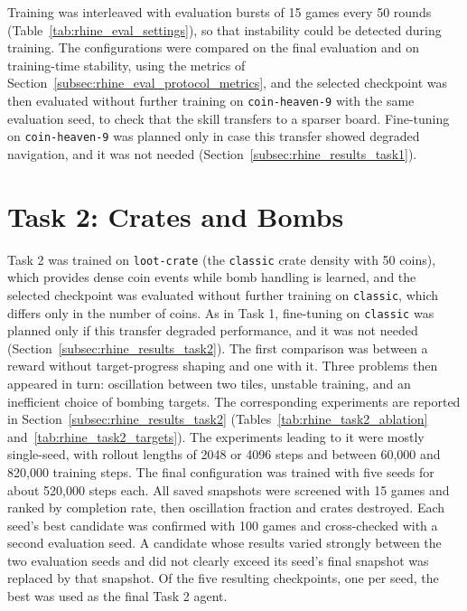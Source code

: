 \documentclass[11pt,a4paper]{report}
\begin{document}
	Training was interleaved with evaluation bursts of 15 games every 50 rounds (Table~\ref{tab:rhine_eval_settings}), so that instability could be detected during training. The configurations were compared on the final evaluation and on training-time stability, using the metrics of Section~\ref{subsec:rhine_eval_protocol_metrics}, and the selected checkpoint was then evaluated without further training on \texttt{coin-heaven-9} with the same evaluation seed, to check that the skill transfers to a sparser board. Fine-tuning on \texttt{coin-heaven-9} was planned only in case this transfer showed degraded navigation, and it was not needed (Section~\ref{subsec:rhine_results_task1}).
	
	\section{Task 2: Crates and Bombs}
	\label{subsec:rhine_training_task2}
	
	Task 2 was trained on \texttt{loot-crate} (the \texttt{classic} crate density with 50 coins), which provides dense coin events while bomb handling is learned, and the selected checkpoint was evaluated without further training on \texttt{classic}, which differs only in the number of coins. As in Task 1, fine-tuning on \texttt{classic} was planned only if this transfer degraded performance, and it was not needed (Section~\ref{subsec:rhine_results_task2}). The first comparison was between a reward without target-progress shaping and one with it. Three problems then appeared in turn: oscillation between two tiles, unstable training, and an inefficient choice of bombing targets. The corresponding experiments are reported in Section~\ref{subsec:rhine_results_task2} (Tables~\ref{tab:rhine_task2_ablation} and~\ref{tab:rhine_task2_targets}). The experiments leading to it were mostly single-seed, with rollout lengths of 2048 or 4096 steps and between 60{,}000 and 820{,}000 training steps. The final configuration was trained with five seeds for about 520{,}000 steps each. All saved snapshots were screened with 15 games and ranked by completion rate, then oscillation fraction and crates destroyed. Each seed's best candidate was confirmed with 100 games and cross-checked with a second evaluation seed. A candidate whose results varied strongly between the two evaluation seeds and did not clearly exceed its seed's final snapshot was replaced by that snapshot. Of the five resulting checkpoints, one per seed, the best was used as the final Task 2 agent.
	
\end{document}
